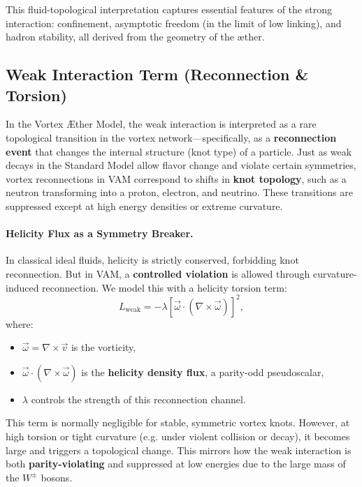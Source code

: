 \medskip
This fluid-topological interpretation captures essential features of the strong interaction: confinement, asymptotic freedom (in the limit of low linking), and hadron stability, all derived from the geometry of the æther.
\subsection{Weak Interaction Term (Reconnection \& Torsion)}

In the Vortex \AE ther Model, the weak interaction is interpreted as a rare topological transition in the vortex network—specifically, as a \textbf{reconnection event} that changes the internal structure (knot type) of a particle. Just as weak decays in the Standard Model allow flavor change and violate certain symmetries, vortex reconnections in VAM correspond to shifts in \textbf{knot topology}, such as a neutron transforming into a proton, electron, and neutrino. These transitions are suppressed except at high energy densities or extreme curvature.

\vspace{0.5em}
\paragraph{Helicity Flux as a Symmetry Breaker.}
In classical ideal fluids, helicity is strictly conserved, forbidding knot reconnection. But in VAM, a \textbf{controlled violation} is allowed through curvature-induced reconnection. We model this with a helicity torsion term:
\begin{equation}
    L_{\text{weak}} = -\lambda \left[ \vec{\omega} \cdot (\nabla \times \vec{\omega}) \right]^2,
    \label{eq:weak-helicity-term}
\end{equation}
where:
\begin{itemize}
    \item \( \vec{\omega} = \nabla \times \vec{v} \) is the vorticity,
    \item \( \vec{\omega} \cdot (\nabla \times \vec{\omega}) \) is the \textbf{helicity density flux}, a parity-odd pseudoscalar,
    \item \( \lambda \) controls the strength of this reconnection channel.
\end{itemize}

This term is normally negligible for stable, symmetric vortex knots. However, at high torsion or tight curvature (e.g. under violent collision or decay), it becomes large and triggers a topological change. This mirrors how the weak interaction is both \textbf{parity-violating} and suppressed at low energies due to the large mass of the \( W^\pm \) bosons.

